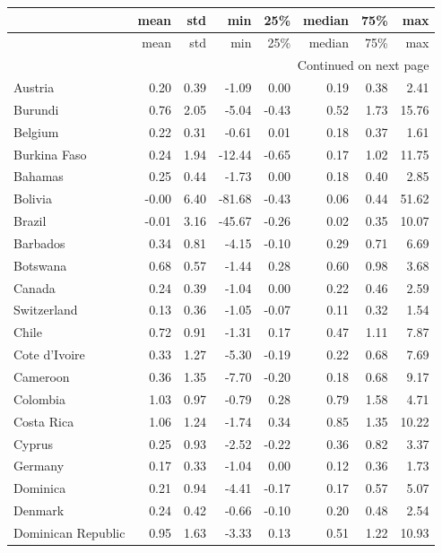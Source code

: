 \begin{longtable}{lrrrrrrr}
\toprule
 & mean & std & min & 25\% & median & 75\% & max \\
\midrule
\endfirsthead
\toprule
 & mean & std & min & 25\% & median & 75\% & max \\
\midrule
\endhead
\midrule
\multicolumn{8}{r}{Continued on next page} \\
\midrule
\endfoot
\bottomrule
\endlastfoot
Austria & 0.20 & 0.39 & -1.09 & 0.00 & 0.19 & 0.38 & 2.41 \\
Burundi & 0.76 & 2.05 & -5.04 & -0.43 & 0.52 & 1.73 & 15.76 \\
Belgium & 0.22 & 0.31 & -0.61 & 0.01 & 0.18 & 0.37 & 1.61 \\
Burkina Faso & 0.24 & 1.94 & -12.44 & -0.65 & 0.17 & 1.02 & 11.75 \\
Bahamas & 0.25 & 0.44 & -1.73 & 0.00 & 0.18 & 0.40 & 2.85 \\
Bolivia & -0.00 & 6.40 & -81.68 & -0.43 & 0.06 & 0.44 & 51.62 \\
Brazil & -0.01 & 3.16 & -45.67 & -0.26 & 0.02 & 0.35 & 10.07 \\
Barbados & 0.34 & 0.81 & -4.15 & -0.10 & 0.29 & 0.71 & 6.69 \\
Botswana & 0.68 & 0.57 & -1.44 & 0.28 & 0.60 & 0.98 & 3.68 \\
Canada & 0.24 & 0.39 & -1.04 & 0.00 & 0.22 & 0.46 & 2.59 \\
Switzerland & 0.13 & 0.36 & -1.05 & -0.07 & 0.11 & 0.32 & 1.54 \\
Chile & 0.72 & 0.91 & -1.31 & 0.17 & 0.47 & 1.11 & 7.87 \\
Cote d'Ivoire & 0.33 & 1.27 & -5.30 & -0.19 & 0.22 & 0.68 & 7.69 \\
Cameroon & 0.36 & 1.35 & -7.70 & -0.20 & 0.18 & 0.68 & 9.17 \\
Colombia & 1.03 & 0.97 & -0.79 & 0.28 & 0.79 & 1.58 & 4.71 \\
Costa Rica & 1.06 & 1.24 & -1.74 & 0.34 & 0.85 & 1.35 & 10.22 \\
Cyprus & 0.25 & 0.93 & -2.52 & -0.22 & 0.36 & 0.82 & 3.37 \\
Germany & 0.17 & 0.33 & -1.04 & 0.00 & 0.12 & 0.36 & 1.73 \\
Dominica & 0.21 & 0.94 & -4.41 & -0.17 & 0.17 & 0.57 & 5.07 \\
Denmark & 0.24 & 0.42 & -0.66 & -0.10 & 0.20 & 0.48 & 2.54 \\
Dominican Republic & 0.95 & 1.63 & -3.33 & 0.13 & 0.51 & 1.22 & 10.93 \\

\end{longtable}
